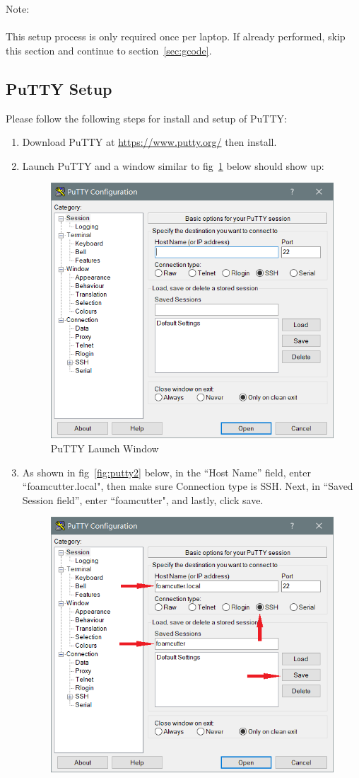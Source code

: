 \documentclass[titlepage,12pt,letter]{report}
\numberwithin{equation}{chapter}
\begin{document}
\begin{tcolorbox}
	{\large
		Note:\\ \\
		 This setup process is only required once per laptop. If already performed, skip this section and continue to section~\ref{sec:gcode}.
	}
\end{tcolorbox}

\subsection{PuTTY Setup}

\noindent Please follow the following steps for install and setup of PuTTY:

\begin{enumerate}[noitemsep,topsep=0pt]
	\item Download PuTTY at \href{https://www.putty.org/}{https://www.putty.org/} then install.
	\item Launch PuTTY and a window similar to fig~\ref{fig:putty1} below should show up:
	\begin{figure} [H]
		\includegraphics[width = 0.6\linewidth]{./Figures/Laptop_Setup/putty1.png}
		\caption{PuTTY Launch Window}
		\label{fig:putty1}
	\end{figure}
	\item As shown in fig~\ref{fig:putty2} below, in the ``Host Name'' field, enter ``foamcutter.local", then make sure Connection type is SSH. Next, in ``Saved Session field'', enter ``foamcutter", and lastly, click save.
	\begin{figure} [H]
		\includegraphics[width = 0.6\linewidth]{./Figures/Laptop_Setup/putty2.png}

\end{figure}
\end{enumerate}
\end{document}
